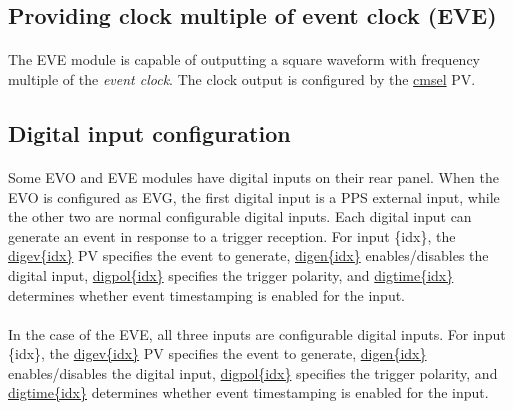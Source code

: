 \documentclass[openany]{article}
\begin{document}
	\subsection{Providing clock multiple of event clock (EVE)}
		\paragraph{} The EVE module is capable of outputting a square waveform with frequency multiple of the \emph{event clock}. The clock output is configured by the \hyperref[pvgroup:eve-rf-output]{cmsel} PV.

	\subsection{Digital input configuration}

		\paragraph{} Some EVO and EVE modules have digital inputs on their rear panel. When the EVO is configured as EVG, the first digital input is a PPS external input, while the other two are normal configurable digital inputs. Each digital input can generate an event in response to a trigger reception. For input \{idx\}, the \hyperref[pvgroup:evg-digital-input]{digev\{idx\}} PV specifies the event to generate, \hyperref[pvgroup:evg-digital-input]{digen\{idx\}} enables/disables the digital input, \hyperref[pvgroup:evg-digital-input]{digpol\{idx\}} specifies the trigger polarity, and \hyperref[pvgroup:evg-digital-input]{digtime\{idx\}} determines whether event timestamping is enabled for the input.

		\paragraph{} In the case of the EVE, all three inputs are configurable digital inputs. For input \{idx\}, the \hyperref[pvgroup:evre-digital-input]{digev\{idx\}} PV specifies the event to generate, \hyperref[pvgroup:evre-digital-input]{digen\{idx\}} enables/disables the digital input, \hyperref[pvgroup:evre-digital-input]{digpol\{idx\}} specifies the trigger polarity, and \hyperref[pvgroup:evre-digital-input]{digtime\{idx\}} determines whether event timestamping is enabled for the input.
\end{document}

